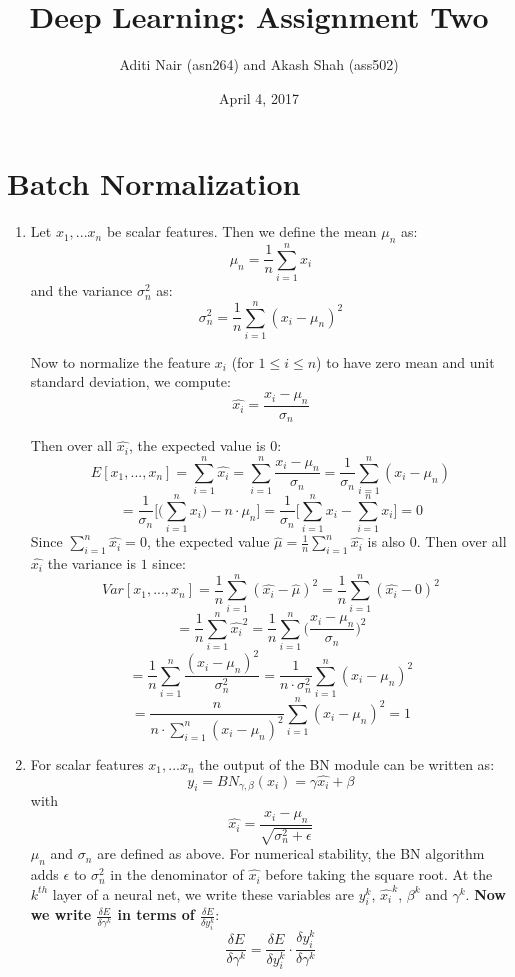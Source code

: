 \documentclass[a4paper]{article}
\title{Deep Learning: Assignment Two}
\author{Aditi Nair (asn264) and Akash Shah (ass502)}
\date{April 4, 2017}
\begin{document}
\maketitle

\section{Batch Normalization}

\begin{enumerate}
\item{Let $x_1,...x_n$ be scalar features. Then we define the mean $\mu_n$ as:
$$ \mu_n = \frac{1}{n} \sum_{i=1}^n x_i$$
and the variance $\sigma_n^2$ as:
$$ \sigma_n^2 = \frac{1}{n} \sum_{i=1}^n (x_i - \mu_n)^2$$

Now to normalize the feature $x_i$ (for $ 1 \leq i \leq n$) to have zero mean and unit standard deviation, we compute: 
$$\hat{x_i} = \frac{x_i - \mu_n}{\sigma_n}$$

Then over all $\hat{x_i}$, the expected value is $0$:
$$E[x_1,...,x_n] = \sum_{i=1}^n \hat{x_i} = \sum_{i=1}^n \frac{x_i - \mu_n}{\sigma_n} 
= \frac{1}{\sigma_n} \sum_{i=1}^n (x_i - \mu_n) $$
$$ =  \frac{1}{\sigma_n}  \Bigg[ \Bigg( \sum_{i=1}^n x_i \Bigg) - n \cdot \mu_n    \Bigg]
=  \frac{1}{\sigma_n}  \Bigg[ \sum_{i=1}^n x_i  - \sum_{i=1}^n x_i  \Bigg] = 0$$
Since $\sum_{i=1}^n \hat{x_i} = 0$, the expected value $\hat{\mu} = \frac{1}{n} \sum_{i=1}^n \hat{x_i}$ is also 0.
\newline
\newline
Then over all $\hat{x_i}$ the variance is $1$ since:
$$Var[x_1,...,x_n] = \frac{1}{n}\sum_{i=1}^n (\hat{x_i} - \hat{\mu})^2 = \frac{1}{n}\sum_{i=1}^n (\hat{x_i} - 0)^2 $$
$$ = \frac{1}{n}\sum_{i=1}^n \hat{x_i}^2 
=  \frac{1}{n}\sum_{i=1}^n \Big( \frac{x_i - \mu_n}{\sigma_n} \Big)^2 $$
$$ = \frac{1}{n}\sum_{i=1}^n  \frac{(x_i - \mu_n)^2}{\sigma_n^2} = \frac{1}{n \cdot \sigma_n^2} \sum_{i=1}^n  (x_i - \mu_n)^2$$
$$
= \frac{n}{n \cdot \sum_{i=1}^n (x_i - \mu_n)^2}  \sum_{i=1}^n  (x_i - \mu_n)^2 = 1
$$}

\item{ For scalar features $x_1,...x_n$ the output of the BN module can be written as:
$$y_i = BN_{\gamma,\beta}(x_i) = \gamma \hat{x_i} + \beta $$
with
$$\hat{x_i} = \frac{x_i - \mu_n}{\sqrt{\sigma_n^2 + \epsilon}}$$
$\mu_n$ and $\sigma_n$ are defined as above. For numerical stability, the BN algorithm adds $\epsilon$ to $\sigma_n^2$ in the denominator of $\hat{x_i}$ before taking the square root. At the $k^{th}$ layer of a neural net, we write these variables are $y_i^k$, $\hat{x_i}^k$, $\beta^k$ and $\gamma^k$.
\newline
\newline
\textbf{Now we write $\frac{\delta E}{\delta \gamma^k}$ in terms of $\frac{\delta E}{\delta y_i^k}$}:
$$ \frac{\delta E}{\delta \gamma^k} = \frac{\delta E}{\delta y_i^k} \cdot \frac{\delta y_i^k}{\delta \gamma^k}$$

}
\end{enumerate}
\end{document}
